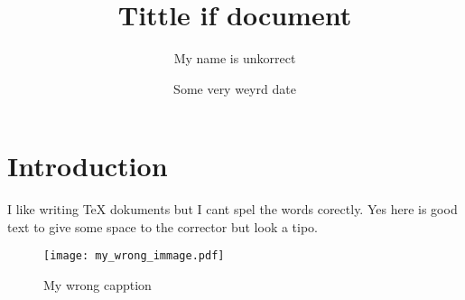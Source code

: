 \documentclass{article}
\title{Tittle if document}
\author{My name is unkorrect}
\date{Some very weyrd date}
\begin{document}
\maketitle

\section{Introduction}

I like writing TeX dokuments but I cant spel the words corectly. Yes here is good text to give some space to the corrector but look a tipo.


\begin{figure}
    \centering
    \texttt{[image: my\_wrong\_immage.pdf]} %
    \caption{My wrong capption} %
    \label{fig:my_wrong_labell} %
\end{figure}
\end{document}
